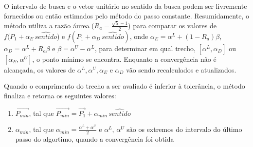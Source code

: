 \documentclass[10pt, a4paper]{article}
\begin{document}
O intervalo de busca e o vetor unitário no sentido da busca podem ser livremente fornecidos ou então estimados
pelo método do passo constante. Resumidamente, o método utiliza a razão áurea ($R_a = \frac{\sqrt{5} - 1}{2}$) para comparar os 
valores de $f(P_1 + \alpha_{E}\,\hat{sentido}$) e $f(P_1 + \alpha_{D}\,\hat{sentido})$,
onde $\alpha_{E} = \alpha^L + (1 - R_a )\beta$, $\alpha_{D} = \alpha^L + R_a\beta$ e $\beta = \alpha^U - \alpha^L$, 
para determinar em qual trecho, $[\alpha^L, \alpha_{D}]$ ou $[\alpha_{E}, \alpha^U]$, o ponto mínimo se encontra. Enquanto a
convergência não é alcançada, os valores de $\alpha^L, \alpha^U, \alpha_E$ e $\alpha_D$ vão sendo recalculados e atualizados.

Quando o comprimento do trecho a ser avaliado é inferior à tolerância, o método finaliza e retorna os seguintes valores:

\begin{enumerate}
  \item $\overrightarrow{P_{min}}$, tal que $\overrightarrow{P_{min}} = \overrightarrow{P_1} + \alpha_{min}\,\hat{sentido}$
  \item $\alpha_{min}$, tal que $\alpha_{min} = \frac{\alpha^L + \alpha^U}{2}$ e $\alpha^L$, $\alpha^U$ são os extremos do
  intervalo do último passo do algortimo, quando a convergência foi obtida
\end{enumerate} 
\end{document}
